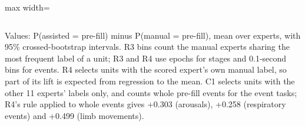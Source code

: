 \begin{table}[h!]
\begin{adjustbox}{max width=\linewidth}
\begin{tabular}{lcccccc}
\bottomrule
\end{tabular}
\end{adjustbox}
\par\smallskip
\begin{minipage}{0.95\linewidth}\footnotesize Values: P(assisted = pre-fill) minus P(manual = pre-fill), mean over experts, with 95\% crossed-bootstrap intervals. R3 bins count the manual experts sharing the most frequent label of a unit; R3 and R4 use epochs for stages and 0.1-second bins for events. R4 selects units with the scored expert's own manual label, so part of its lift is expected from regression to the mean. C1 selects units with the other 11 experts' labels only, and counts whole pre-fill events for the event tasks; R4's rule applied to whole events gives +0.303 (arousals), +0.258 (respiratory events) and +0.499 (limb movements).\end{minipage}
\end{table}
